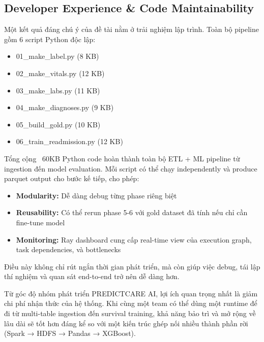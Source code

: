 \subsection{Developer Experience \& Code Maintainability}

Một kết quả đáng chú ý của đề tài nằm ở trải nghiệm lập trình. Toàn bộ pipeline gồm 6 script Python độc lập:
\begin{itemize}
    \item 01\_make\_label.py (8 KB)
    \item 02\_make\_vitals.py (12 KB)
    \item 03\_make\_labs.py (11 KB)
    \item 04\_make\_diagnoses.py (9 KB)
    \item 05\_build\_gold.py (10 KB)
    \item 06\_train\_readmission.py (12 KB)
\end{itemize}

Tổng cộng ~60KB Python code hoàn thành toàn bộ ETL + ML pipeline từ ingestion đến model evaluation. Mỗi script có thể chạy independently và produce parquet output cho bước kế tiếp, cho phép:
\begin{itemize}
    \item \textbf{Modularity:} Dễ dàng debug từng phase riêng biệt
    \item \textbf{Reusability:} Có thể rerun phase 5-6 với gold dataset đã tính nếu chỉ cần fine-tune model
    \item \textbf{Monitoring:} Ray dashboard cung cấp real-time view của execution graph, task dependencies, và bottlenecks
\end{itemize}

Điều này không chỉ rút ngắn thời gian phát triển, mà còn giúp việc debug, tái lập thí nghiệm và quan sát end-to-end trở nên dễ dàng hơn.

Từ góc độ nhóm phát triển PREDICTCARE AI, lợi ích quan trọng nhất là giảm chi phí nhận thức của hệ thống. Khi cùng một team có thể dùng một runtime để đi từ multi-table ingestion đến survival training, khả năng bảo trì và mở rộng về lâu dài sẽ tốt hơn đáng kể so với một kiến trúc ghép nối nhiều thành phần rời (Spark → HDFS → Pandas → XGBoost).